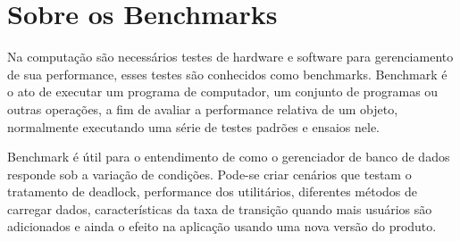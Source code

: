 \section{Sobre os Benchmarks} \label{sec:bench}
	Na computação são necessários testes de hardware e software para gerenciamento de sua performance, esses testes são conhecidos como benchmarks. Benchmark é o ato de executar um programa de computador, um conjunto de programas ou outras operações, a fim de avaliar a performance relativa de um objeto, normalmente executando uma série de testes padrões e ensaios nele.

	Benchmark é útil para o entendimento de como o gerenciador de banco de dados responde sob a variação de condições. Pode-se criar cenários que testam o tratamento de deadlock, performance dos utilitários, diferentes métodos de carregar dados, características da taxa de transição quando mais usuários são adicionados e ainda o efeito na aplicação usando uma nova versão do produto.
